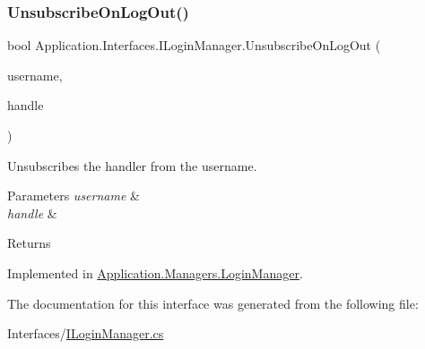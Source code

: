 \subsubsection{\texorpdfstring{Unsubscribe\+On\+Log\+Out()}{UnsubscribeOnLogOut()}}
{\footnotesize\ttfamily bool Application.\+Interfaces.\+I\+Login\+Manager.\+Unsubscribe\+On\+Log\+Out (\begin{DoxyParamCaption}\item[{string}]{username,  }\item[{\mbox{\hyperlink{namespace_application_1_1_interfaces_a3ba96a057acca29f3e2e533aeb2f30e0}{User\+Logged\+Out\+Handle}}}]{handle }\end{DoxyParamCaption})}



Unsubscribes the handler from the username. 


\begin{DoxyParams}{Parameters}
{\em username} & \\
\hline
{\em handle} & \\
\hline
\end{DoxyParams}
\begin{DoxyReturn}{Returns}

\end{DoxyReturn}


Implemented in \mbox{\hyperlink{class_application_1_1_managers_1_1_login_manager_a4490bbdc301ad6eab762fd1a567fd970}{Application.\+Managers.\+Login\+Manager}}.



The documentation for this interface was generated from the following file\+:\begin{DoxyCompactItemize}
\item 
Interfaces/\mbox{\hyperlink{_i_login_manager_8cs}{I\+Login\+Manager.\+cs}}\end{DoxyCompactItemize}
